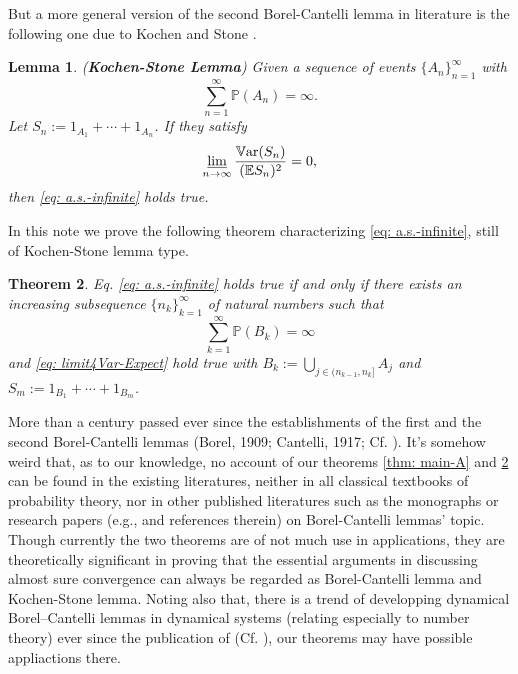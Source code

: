 \documentclass{article}
\newtheorem{thm}{Theorem}[section]
\newtheorem{lem}[thm]{Lemma}
\numberwithin{equation}{section}
\newcommand{\Var}{{\mathbb{V}}{\rm ar}}
\newcommand{\Enum}{\mathbb{E}}
\newcommand{\Pnum}{\mathbb{P}}
\begin{document}
But a more general version of the second Borel-Cantelli lemma in literature is the following one due to Kochen and Stone \cite{KS1964} \cite[Exercise 2.3.10]{Durrett}.
\begin{lem} (\textbf{Kochen-Stone Lemma})
Given a sequence of events $\{A_n\}_{n=1}^\infty$ with
\begin{equation}\label{eq: prob-sum-infinite}
\sum_{n=1}^\infty \Pnum (A_n)=\infty.
\end{equation}
Let $S_n:=1_{A_1}+\cdots+1_{A_n}$. If they satisfy
\begin{equation}\label{eq: limit4Var-Expect}
\varliminf_{n \to \infty} \frac{\Var (S_n)}{(\Enum S_n)^2}=0,
\end{equation}
then \eqref{eq: a.s.-infinite} holds true.
\end{lem}
In this note we prove the following theorem characterizing \eqref{eq: a.s.-infinite}, still of Kochen-Stone lemma type.
\begin{thm}\label{thm: main-B} %
Eq. \eqref{eq: a.s.-infinite} holds true if and only if there exists an increasing subsequence $\{n_k\}_{k=1}^\infty$ of natural numbers such that
\begin{equation}\label{eq: prob-sum-B-infinite}
\sum_{k=1}^\infty \Pnum (B_k)=\infty
\end{equation}
and \eqref{eq: limit4Var-Expect} hold true with $\displaystyle B_k:=\bigcup_{j \in (n_{k-1}, n_k]} A_j$ and $S_m:=1_{B_1}+\cdots+1_{B_m}$.
\end{thm}

More than a century passed ever since the establishments of the first and the second Borel-Cantelli lemmas (Borel, 1909; Cantelli, 1917; Cf. \cite{EH2022}). It's somehow weird 
that, as to our knowledge, no account of our theorems \ref{thm: main-A} and \ref{thm: main-B} can be found in the existing literatures, neither in all classical textbooks of 
probability theory, nor in other published literatures such as the monographs \cite{Chandra2012} \cite{DMR2022} or research papers (e.g., \cite{CE1952} \cite{Lamperti1963} 
\cite{DF1965} \cite{Freedman1973} \cite{Davie2001} \cite{Hoover2002} \cite{Petrov2002} \cite{Luzia2014} \cite{Frolov2021} \cite{EH2022} and references therein) on Borel-Cantelli 
lemmas' topic. Though currently the two theorems are of not much use in applications, they are theoretically significant in proving that the essential arguments in discussing 
almost sure convergence can always be regarded as Borel-Cantelli lemma and Kochen-Stone lemma. Noting also that, there is a trend of developping dynamical Borel–Cantelli lemmas in 
dynamical systems (relating especially to  number theory) ever since the publication of \cite{Philipp1967} (Cf. \cite{CK2001} \cite{Kifer2021} \cite{DMR2022} \cite{HLSW2022}), our 
theorems may have possible appliactions there.
\end{document}
